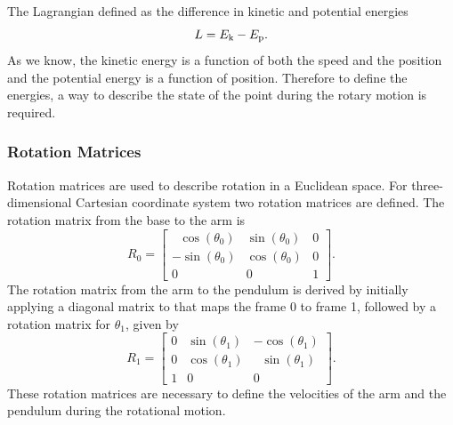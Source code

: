 The Lagrangian defined as the difference in kinetic and potential energies
\begin{equation}
L = E _{\text{k}} - E _{\text{p}}.
\end{equation}
As we know, the kinetic energy is a function of both the speed and the position and the potential energy is a function of position. Therefore to define the energies, a way to describe the state of the point during the rotary motion is required.
\subsubsection{Rotation Matrices}
Rotation matrices are used to describe rotation in a Euclidean space. For three-dimensional Cartesian coordinate system two rotation matrices are defined.
The rotation matrix from the base to the arm is
\begin{equation}
	R_0 = 	\begin{bmatrix}
					\ \ \,\cos(\theta_0) & \sin(\theta_0) & 0\\
					-\sin(\theta_0) & \cos(\theta_0) & 0\\
					0 & 0 & 1
				\end{bmatrix}.
\end{equation}
The rotation matrix from the arm to the pendulum is derived by
initially applying a diagonal matrix to that maps the frame
0 to frame 1, followed by a rotation matrix for $\theta_1$, given by
\begin{equation}
R_1 = 	\begin{bmatrix}
			0 & \sin(\theta_1) & -\cos(\theta_1)\\
			0 & \cos(\theta_1) & \ \ \,\sin(\theta_1)\\
			1 & 0 & 0                      
		\end{bmatrix}.
\end{equation}
These rotation matrices are necessary to define the velocities of the arm and the pendulum during the rotational motion. 
